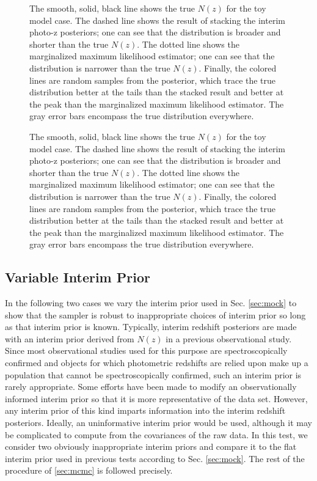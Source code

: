 \documentclass[preprint]{aastex}
\begin{document}
\begin{figure}
\caption{The smooth, solid, black line shows the true $N(z)$ for the toy model 
case.  The dashed line shows the result of stacking the interim photo-z 
posteriors; one can see that the distribution is broader and shorter than the 
true $N(z)$.  The dotted line shows the marginalized maximum likelihood 
estimator; one can see that the distribution is narrower than the true $N(z)$.  
Finally, the colored lines are random samples from the posterior, which trace 
the true distribution better at the tails than the stacked result and better at 
the peak than the marginalized maximum likelihood estimator.  The gray error 
bars encompass the true distribution everywhere.}
\label{fig:toy-samp}
\end{figure}

\begin{figure}
\caption{The smooth, solid, black line shows the true $N(z)$ for the toy model 
case.  The dashed line shows the result of stacking the interim photo-z 
posteriors; one can see that the distribution is broader and shorter than the 
true $N(z)$.  The dotted line shows the marginalized maximum likelihood 
estimator; one can see that the distribution is narrower than the true $N(z)$.  
Finally, the colored lines are random samples from the posterior, which trace 
the true distribution better at the tails than the stacked result and better at 
the peak than the marginalized maximum likelihood estimator.  The gray error 
bars encompass the true distribution everywhere.}
\label{fig:toy-comp}
\end{figure}

\clearpage
\subsection{Variable Interim Prior}
\label{sec:interim}

In the following two cases we vary the interim prior used in Sec. 
\ref{sec:mock} to show that the sampler is robust to inappropriate choices of 
interim prior so long as that interim prior is known.  Typically, interim 
redshift posteriors are made with an interim prior derived from $N(z)$ in a 
previous observational study.  Since most observational studies used for this 
purpose are spectroscopically confirmed and objects for which photometric 
redshifts are relied upon make up a population that cannot be spectroscopically 
confirmed, such an interim prior is rarely appropriate.  Some efforts have been 
made to modify an observationally informed interim prior so that it is more 
representative of the data set.  \citep{Sheldon2012}  However, any interim 
prior of this kind imparts information into the interim redshift posteriors.  
Ideally, an uninformative interim prior would be used, although it may be 
complicated to compute from the covariances of the raw data.  In this test, we 
consider two obviously inappropriate interim priors and compare it to the flat 
interim prior used in previous tests according to Sec. \ref{sec:mock}.  The 
rest of the procedure of \ref{sec:mcmc} is followed precisely.
\end{document}
